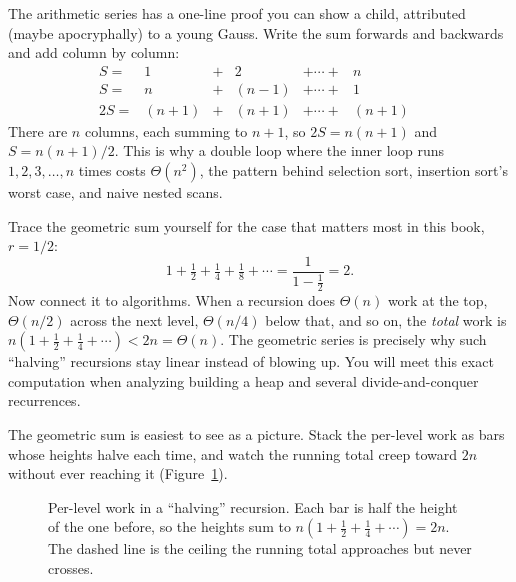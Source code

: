 The arithmetic series has a one-line proof you can show a child, attributed (maybe
apocryphally) to a young Gauss. Write the sum forwards and backwards and add
column by column:
\[
\begin{array}{ccccccc}
S = & 1 & + & 2 & + \cdots + & n & \\
S = & n & + & (n{-}1) & + \cdots + & 1 & \\ \hline
2S = & (n{+}1) & + & (n{+}1) & + \cdots + & (n{+}1) &
\end{array}
\]
There are $n$ columns, each summing to $n+1$, so $2S = n(n+1)$ and
$S = n(n+1)/2$. This is why a double loop where the inner loop runs $1, 2, 3,
\dots, n$ times costs $\Theta(n^2)$, the pattern behind selection sort,
insertion sort's worst case, and naive nested scans.

\begin{labbox}
Trace the geometric sum yourself for the case that matters most in this book,
$r = 1/2$:
\[
1 + \tfrac12 + \tfrac14 + \tfrac18 + \cdots = \frac{1}{1 - \tfrac12} = 2.
\]
Now connect it to algorithms. When a recursion does $\Theta(n)$ work at the top,
$\Theta(n/2)$ across the next level, $\Theta(n/4)$ below that, and so on, the
\emph{total} work is $n(1 + \tfrac12 + \tfrac14 + \cdots) < 2n = \Theta(n)$. The
geometric series is precisely why such ``halving'' recursions stay linear instead
of blowing up. You will meet this exact computation when analyzing building a heap
and several divide-and-conquer recurrences.
\end{labbox}

The geometric sum is easiest to see as a picture. Stack the per-level
work as bars whose heights halve each time, and watch the running total creep
toward $2n$ without ever reaching it (Figure~\ref{ch39:fig-geometric}).

\begin{figure}[H]
\begin{center}
\end{center}
\caption{Per-level work in a ``halving'' recursion. Each bar is half the height of
the one before, so the heights sum to $n(1+\tfrac12+\tfrac14+\cdots)=2n$. The dashed
line is the ceiling the running total approaches but never crosses.}
\label{ch39:fig-geometric}
\end{figure}

